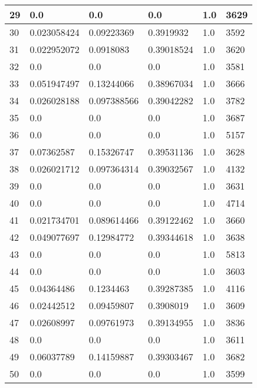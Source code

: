\begin{longtable}{|l|l|l|l|l|l|}
29 & 0.0 & 0.0 & 0.0 & 1.0 & 3629 \\ \hline 
30 & 0.023058424 & 0.09223369 & 0.3919932 & 1.0 & 3592 \\ \hline 
31 & 0.022952072 & 0.0918083 & 0.39018524 & 1.0 & 3620 \\ \hline 
32 & 0.0 & 0.0 & 0.0 & 1.0 & 3581 \\ \hline 
33 & 0.051947497 & 0.13244066 & 0.38967034 & 1.0 & 3666 \\ \hline 
34 & 0.026028188 & 0.097388566 & 0.39042282 & 1.0 & 3782 \\ \hline 
35 & 0.0 & 0.0 & 0.0 & 1.0 & 3687 \\ \hline 
36 & 0.0 & 0.0 & 0.0 & 1.0 & 5157 \\ \hline 
37 & 0.07362587 & 0.15326747 & 0.39531136 & 1.0 & 3628 \\ \hline 
38 & 0.026021712 & 0.097364314 & 0.39032567 & 1.0 & 4132 \\ \hline 
39 & 0.0 & 0.0 & 0.0 & 1.0 & 3631 \\ \hline 
40 & 0.0 & 0.0 & 0.0 & 1.0 & 4714 \\ \hline 
41 & 0.021734701 & 0.089614466 & 0.39122462 & 1.0 & 3660 \\ \hline 
42 & 0.049077697 & 0.12984772 & 0.39344618 & 1.0 & 3638 \\ \hline 
43 & 0.0 & 0.0 & 0.0 & 1.0 & 5813 \\ \hline 
44 & 0.0 & 0.0 & 0.0 & 1.0 & 3603 \\ \hline 
45 & 0.04364486 & 0.1234463 & 0.39287385 & 1.0 & 4116 \\ \hline 
46 & 0.02442512 & 0.09459807 & 0.3908019 & 1.0 & 3609 \\ \hline 
47 & 0.02608997 & 0.09761973 & 0.39134955 & 1.0 & 3836 \\ \hline 
48 & 0.0 & 0.0 & 0.0 & 1.0 & 3611 \\ \hline 
49 & 0.06037789 & 0.14159887 & 0.39303467 & 1.0 & 3682 \\ \hline 
50 & 0.0 & 0.0 & 0.0 & 1.0 & 3599 \\ \hline 
\end{longtable}
